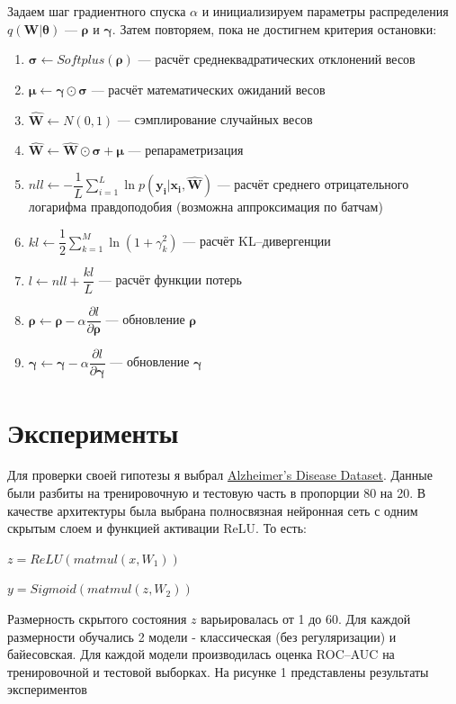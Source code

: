 \documentclass{article}
\begin{document}
Задаем шаг градиентного спуска $\alpha$ и инициализируем параметры распределения $q(\pmb{W} | \pmb{\theta})$ — $\pmb{\rho}$ и $\pmb{\gamma}$. Затем повторяем, пока не достигнем критерия остановки:
\begin{enumerate}
    \item $\pmb{\sigma} \leftarrow Softplus(\pmb{\rho})$ --- расчёт среднеквадратических отклонений весов
    \item $\pmb{\mu} \leftarrow \pmb{\gamma} \odot \pmb{\sigma}$ --- расчёт математических ожиданий весов
    \item $\hat{\pmb{W}} \leftarrow N(0, 1)$ --- сэмплирование случайных весов
    \item $\hat{\pmb{W}} \leftarrow \hat{\pmb{W}} \odot \pmb{\sigma} + \pmb{\mu}$ --- репараметризация
    \item $nll \leftarrow -\dfrac{1}{L}\sum_{i=1}^{L}{\ln{p( \pmb{y_{i}} | \pmb{x_{i}}, \pmb{\hat{W}})}}$ --- расчёт среднего отрицательного логарифма правдоподобия (возможна аппроксимация по батчам)
    \item $kl \leftarrow \dfrac{1}{2}\sum_{k=1}^{M}\ln({1 + \gamma_{k}^{2}})$ --- расчёт KL--дивергенции
    \item $l \leftarrow nll + \dfrac{kl}{L}$ --- расчёт функции потерь
    \item $\pmb{\rho} \leftarrow \pmb{\rho} - \alpha \dfrac{\partial l}{\partial \pmb{\rho}}$ --- обновление $\pmb{\rho}$
    \item $\pmb{\gamma} \leftarrow \pmb{\gamma} - \alpha \dfrac{\partial l}{\partial \pmb{\gamma}}$ --- обновление $\pmb{\gamma}$
\end{enumerate}

\section{Эксперименты}

Для проверки своей гипотезы я выбрал \href{https://www.kaggle.com/datasets/rabieelkharoua/alzheimers-disease-dataset}{Alzheimer's Disease Dataset}. Данные были разбиты на тренировочную и тестовую часть в пропорции 80 на 20. В качестве архитектуры была выбрана полносвязная нейронная сеть с одним скрытым слоем и функцией активации ReLU. То есть:

$z = ReLU(matmul(x, W_1))$

$y = Sigmoid(matmul(z, W_2))$

Размерность скрытого состояния $z$ варьировалась от 1 до 60. Для каждой размерности обучались 2 модели - классическая (без регуляризации) и байесовская. Для каждой модели производилась оценка ROC--AUC на тренировочной и тестовой выборках. На рисунке 1 представлены результаты экспериментов
\end{document}
